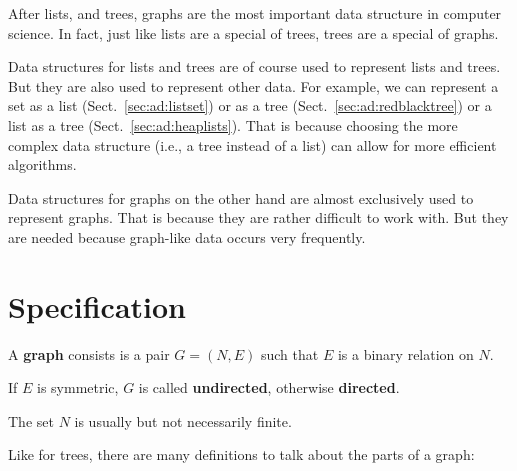 After lists, and trees, graphs are the most important data structure in computer science.
In fact, just like lists are a special of trees, trees are a special of graphs.

Data structures for lists and trees are of course used to represent lists and trees.
But they are also used to represent other data.
For example, we can represent a set as a list (Sect.~\ref{sec:ad:listset}) or as a tree (Sect.~\ref{sec:ad:redblacktree}) or a list as a tree (Sect.~\ref{sec:ad:heaplists}).
That is because choosing the more complex data structure (i.e., a tree instead of a list) can allow for more efficient algorithms.

Data structures for graphs on the other hand are almost exclusively used to represent graphs.
That is because they are rather difficult to work with.
But they are needed because graph-like data occurs very frequently.

\section{Specification}

\begin{definition}[Graph]
A \textbf{graph} consists is a pair $G=(N,E)$ such that $E$ is a binary relation on $N$.

If $E$ is symmetric, $G$ is called \textbf{undirected}, otherwise \textbf{directed}.
\end{definition}

The set $N$ is usually but not necessarily finite.

Like for trees, there are many definitions to talk about the parts of a graph:

